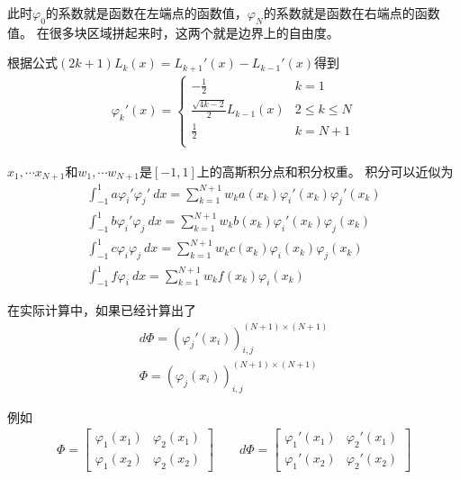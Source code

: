\documentclass[12pt,a4paper]{article}
\begin{document}
此时$\varphi_0$的系数就是函数在左端点的函数值，$\varphi_N$的系数就是函数在右端点的函数值。
在很多块区域拼起来时，这两个就是边界上的自由度。

根据公式$(2k+1) L_k(x) = L_{k+1}'(x) - L_{k-1}'(x)$得到
\begin{align*}
\varphi_k'(x) =
\left\{ \begin{array}{ll}
-\frac{1}{2} & k = 1 \\
\frac{\sqrt{4k-2}}{2} L_{k-1}(x) & 2 \leq k \leq N \\
\frac{1}{2} & k = N+1 \\
\end{array} \right.
\end{align*}

$x_1, \cdots x_{N+1}$和$w_1, \cdots w_{N+1}$是$[-1, 1]$上的高斯积分点和积分权重。
积分可以近似为
\begin{align*}
\int_{-1}^{1} a \varphi_i' \varphi_j' \ dx = \sum_{k=1}^{N+1} w_k a(x_k) \varphi_i'(x_k) \varphi_j'(x_k) \\
\int_{-1}^{1} b \varphi_i' \varphi_j \ dx = \sum_{k=1}^{N+1} w_k b(x_k) \varphi_i'(x_k) \varphi_j(x_k) \\
\int_{-1}^{1} c \varphi_i \varphi_j \ dx = \sum_{k=1}^{N+1} w_k c(x_k) \varphi_i(x_k) \varphi_j(x_k) \\
\int_{-1}^{1} f \varphi_i \ dx = \sum_{k=1}^{N+1} w_k f(x_k) \varphi_i(x_k)
\end{align*}

在实际计算中，如果已经计算出了
\begin{align*}
d\Phi = (\varphi_j'(x_i))_{i,j}^{(N+1) \times (N+1)} \\
\Phi = (\varphi_j(x_i))_{i,j}^{(N+1) \times (N+1)}
\end{align*}

例如
\begin{align*}
\Phi = \left[
\begin{array}{cc}
\varphi_1(x_1) & \varphi_2(x_1) \\
\varphi_1(x_2) & \varphi_2(x_2)
\end{array}
\right]
\qquad
d\Phi = \left[
\begin{array}{cc}
\varphi_1'(x_1) & \varphi_2'(x_1) \\
\varphi_1'(x_2) & \varphi_2'(x_2)
\end{array}
\right]
\end{align*}
\end{document}
